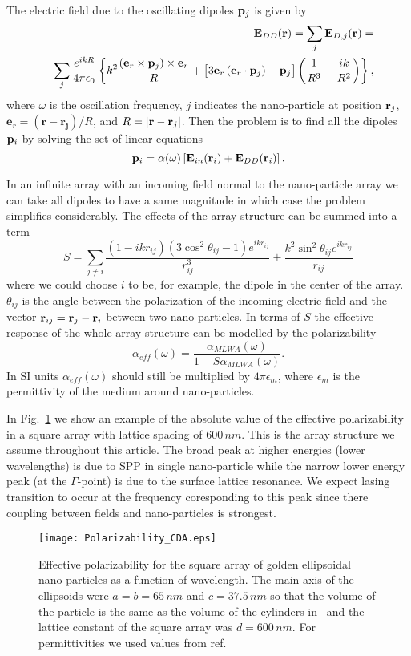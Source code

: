\documentclass{iopart}
\newcommand{\beq}{\begin{equation}}
\newcommand{\enq}{\end{equation}}
\begin{document}
The electric field due to the oscillating dipoles ${\bf p}_j$ 
is given by
\begin{eqnarray}
&&{\bf E}_{DD}({\bf r})=\sum_{j} {\bf E}_{D,j}({\bf r})
= \\
&&\sum_{j} \frac{e^{i k R}}{4 \pi \epsilon_0} \left\{ 
k^2 \frac{\left( {\bf e}_r \times {\bf p}_j \right) \times {\bf e}_r }{R} + 
\bigl[ 
 3 {\bf e}_r \left( {\bf e}_r \cdot {\bf p}_j\right) - {\bf p}_j
\bigr] \left( \frac{1}{R^3} -\frac{i k}{R^2}\right)
\right\},\nonumber \label{DipoleFieldsA} 
\end{eqnarray}
where $\omega$ is the oscillation frequency, $j$ indicates the nano-particle at position ${\bf r}_j$, $\bm{e}_r=\bm{(r-r_j)}/R$,
and $R=|{\bf r}-{\bf r}_j|$.
Then the problem is to find all the dipoles ${\bf p}_i$ by solving the set of
linear equations
\beq
{\bf p}_i=\alpha(\omega)\left[{\bf E}_{in}({\bf r}_i)+{\bf E}_{DD}({\bf r}_i)\right].
\enq

In an infinite array with an incoming field normal to the nano-particle array we can take all dipoles to have a same magnitude
in which case the problem simplifies considerably. The effects of the array
structure can be summed into a term
\beq
S=\sum_{j\neq i}\frac{(1-ikr_{ij})(3\cos^2\theta_{ij}-1)e^{ikr_{ij}}}{r_{ij}^3}
+\frac{k^2\sin^2\theta_{ij}e^{ikr_{ij}}}{r_{ij}}
\enq
where we could choose $i$ to be, for example, the dipole in the center
of the array. $\theta_{ij}$ is the angle between the polarization of the 
incoming electric field and the vector
${\bf r}_{ij}={\bf r}_j-{\bf r}_i$ between two nano-particles. In terms
of $S$ the effective response of the whole array structure can be modelled
by the polarizability
\beq
\alpha_{eff}(\omega)=\frac{\alpha_{MLWA}(\omega)}{1-S\alpha_{MLWA}(\omega)}.
\enq
In SI units $\alpha_{eff}(\omega)$ should still be multiplied by $4\pi\epsilon_m$, where $\epsilon_m$ is the permittivity of the medium around
nano-particles.

In Fig.~\ref{fig:arraypolarizability} we show an example of the absolute value of the effective polarizability
in a square array with lattice spacing of $600\, nm$. This is the array structure we assume throughout this article.
 The broad peak at higher energies (lower wavelengths)
is due to SPP in single nano-particle while the narrow lower energy peak (at the $\Gamma$-point) is due to 
the surface lattice resonance. We expect lasing transition to occur at the frequency 
coresponding to this peak since there coupling between fields and nano-particles is strongest.
\begin{figure} %
\texttt{[image: Polarizability\_CDA.eps]}
\caption[Fig3]{Effective polarizability for the square array of golden ellipsoidal nano-particles
as a function of wavelength.
 The main axis of the ellipsoids were $a=b=65\, nm$ and $c=37.5\, nm$ so that the volume of the particle is the same as the volume of the cylinders in~\cite{zhou_lasing_2013} and the lattice constant of the square array was $d=600\, nm$. For permittivities we used values from ref.~\cite{johnson_optical_1972}
}
\label{fig:arraypolarizability}
\end{figure} 
\end{document}

